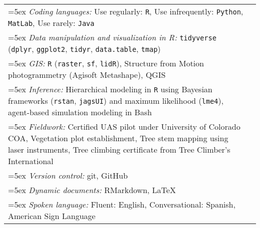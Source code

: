 \begin{longtable}{@{}>{\raggedright}p{6.25in} >{\raggedleft}X@{}}

\hangindent=5ex \emph{Coding languages:} Use regularly: \texttt{R}, Use infrequently: \texttt{Python}, \texttt{MatLab}, Use rarely: \texttt{Java} & \tabularnewline

\hangindent=5ex \emph{Data manipulation and visualization in R:} \texttt{tidyverse} (\texttt{dplyr}, \texttt{ggplot2}, \texttt{tidyr}, \texttt{data.table}, \texttt{tmap}) & \tabularnewline

\hangindent=5ex \emph{GIS:} \texttt{R} (\texttt{raster}, \texttt{sf}, \texttt{lidR}), Structure from Motion photogrammetry (Agisoft Metashape), QGIS & \tabularnewline


\hangindent=5ex \emph{Inference:} Hierarchical modeling in \texttt{R} using Bayesian frameworks (\texttt{rstan}, \texttt{jagsUI}) and maximum likelihood (\texttt{lme4}), agent-based simulation modeling in Bash  & \tabularnewline

\hangindent=5ex \emph{Fieldwork:} Certified UAS pilot under University of Colorado COA, Vegetation plot establishment, Tree stem mapping using laser instruments, Tree climbing certificate from Tree Climber's International & \tabularnewline

\hangindent=5ex \emph{Version control:} git, GitHub & \tabularnewline

\hangindent=5ex \emph{Dynamic documents:} RMarkdown, \LaTeX{} & \tabularnewline

\hangindent=5ex \emph{Spoken language:} Fluent: English, Conversational: Spanish, American Sign Language & \tabularnewline

\end{longtable}
